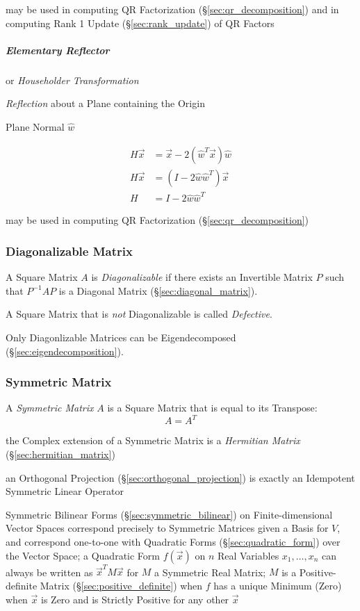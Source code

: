 \fist may be used in computing QR Factorization (\S\ref{sec:qr_decomposition})
and in computing Rank 1 Update (\S\ref{sec:rank_update}) of QR Factors



\subparagraph{Elementary Reflector}\label{sec:elementary_reflector}\hfill

or \emph{Householder Transformation}

\emph{Reflection} about a Plane containing the Origin

Plane Normal $\hat{w}$

\begin{align*}
  H\vec{x} & = \vec{x} - 2(\hat{w}^T\vec{x})\hat{w} \\
  H\vec{x} & = (I - 2\hat{w}\hat{w}^T)\vec{x}       \\
         H & = I - 2\hat{w}\hat{w}^T
\end{align*}

\fist may be used in computing QR Factorization (\S\ref{sec:qr_decomposition})



\subsubsection{Diagonalizable Matrix}\label{sec:diagonalizable_matrix}

A Square Matrix $A$ is \emph{Diagonalizable} if there exists an Invertible
Matrix $P$ such that $P^{-1}AP$ is a Diagonal Matrix
(\S\ref{sec:diagonal_matrix}).

A Square Matrix that is \emph{not} Diagonalizable is called \emph{Defective}.

Only Diagonlizable Matrices can be Eigendecomposed
(\S\ref{sec:eigendecomposition}).



\subsubsection{Symmetric Matrix}\label{sec:symmetric_matrix}

A \emph{Symmetric Matrix} $A$ is a Square Matrix that is equal to its
Transpose:
\[
  A = A^T
\]

the Complex extension of a Symmetric Matrix is a \emph{Hermitian Matrix}
(\S\ref{sec:hermitian_matrix})

an Orthogonal Projection (\S\ref{sec:orthogonal_projection}) is exactly an
Idempotent Symmetric Linear Operator

Symmetric Bilinear Forms (\S\ref{sec:symmetric_bilinear}) on
Finite-dimensional Vector Spaces correspond precisely to Symmetric Matrices
given a Basis for $V$, and correspond one-to-one with Quadratic Forms
(\S\ref{sec:quadratic_form}) over the Vector Space;
a Quadratic Form $f(\vec{x})$ on $n$ Real Variables $x_1,\ldots,x_n$ can always
be written as $\vec{x}^T M \vec{x}$ for $M$ a Symmetric Real Matrix; $M$ is a
Positive-definite Matrix (\S\ref{sec:positive_definite}) when $f$ has a unique
Minimum (Zero) when $\vec{x}$ is Zero and is Strictly Positive for any other
$\vec{x}$

